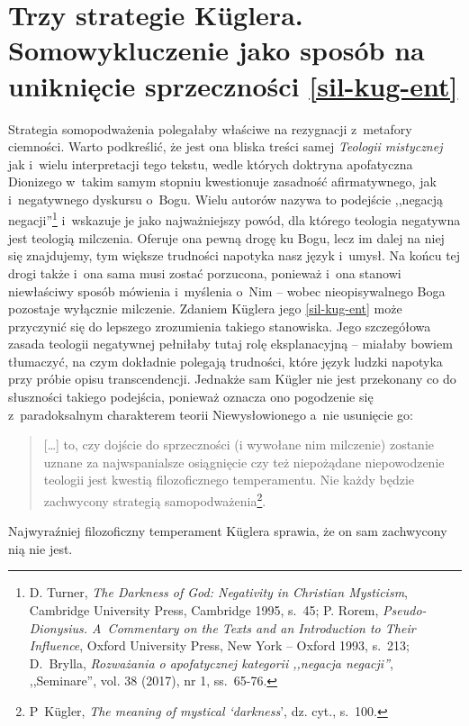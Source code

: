 \section{Trzy strategie Küglera. Somowykluczenie jako sposób na uniknięcie sprzeczności \ref{sil-kug-ent}}

Strategia somopodważenia polegałaby właściwe na rezygnacji z~metafory ciemności. Warto podkreślić, że jest ona bliska treści samej \textit{Teologii mistycznej} jak i~wielu interpretacji tego tekstu, wedle których doktryna apofatyczna Dionizego w~takim samym stopniu kwestionuje zasadność afirmatywnego, jak i~negatywnego dyskursu o~Bogu. Wielu autorów nazywa to podejście ,,negacją negacji''\footnote{D. Turner, \textit{The Darkness of God: Negativity in Christian Mysticism}, Cambridge University Press, Cambridge 1995, s.~45; P. Rorem, \textit{Pseudo-Dionysius. A~Commentary on the Texts and an Introduction to Their Influence}, Oxford University Press, New York -- Oxford 1993, s.~213; D.~Brylla, \textit{Rozważania o apofatycznej kategorii ,,negacja negacji''}, ,,Seminare'', vol. 38 (2017), nr 1, ss.~65-76.} i~wskazuje je jako najważniejszy powód, dla którego teologia negatywna jest teologią milczenia. Oferuje ona pewną drogę ku Bogu, lecz im dalej na niej się znajdujemy, tym większe trudności napotyka nasz język i~umysł. Na końcu tej drogi także i~ona sama musi zostać porzucona, ponieważ i~ona stanowi niewłaściwy sposób mówienia i~myślenia o~Nim -- wobec nieopisywalnego Boga pozostaje wyłącznie milczenie. Zdaniem Küglera jego \ref{sil-kug-ent} może przyczynić się do lepszego zrozumienia takiego stanowiska. Jego szczegółowa zasada teologii negatywnej pełniłaby tutaj rolę eksplanacyjną -- miałaby bowiem tłumaczyć, na czym dokładnie polegają trudności, które język ludzki napotyka przy próbie opisu transcendencji. Jednakże sam Kügler nie jest przekonany co do słuszności takiego podejścia, ponieważ oznacza ono pogodzenie się z~paradoksalnym charakterem teorii Niewysłowionego a~nie usunięcie go:

\begin{quote}
[\ldots] to, czy dojście do sprzeczności (i wywołane nim milczenie) zostanie uznane za najwspanialsze osiągnięcie czy też niepożądane niepowodzenie teologii jest kwestią filozoficznego temperamentu. Nie każdy będzie zachwycony strategią samopodważenia\footnote{P~Kügler, \textit{The meaning of mystical ‘darkness}', dz. cyt., s.~100.}.
\end{quote}
Najwyraźniej filozoficzny temperament Küglera sprawia, że on sam zachwycony nią nie jest.

